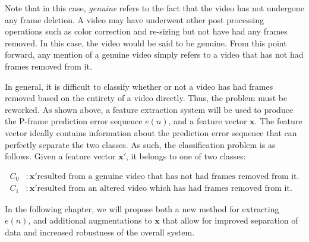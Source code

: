 Note that in this case, \emph{genuine} refers to the fact that the video has not undergone any frame deletion. A video may have underwent other post processing operations such as color correction and re-sizing but not have had any frames removed. In this case, the video would be said to be genuine. From this point forward, any mention of a genuine video simply refers to a video that has not had frames removed from it.

In general, it is difficult to classify whether or not a video has had frames removed based on the entirety of a video directly. Thus, the problem must be reworked. As shown above, a feature extraction system will be used to produce the P-frame prediction error sequence $e(n)$, and a feature vector $\bm{x}$. The feature vector ideally contains information about the prediction error sequence that can perfectly separate the two classes. As such, the classification problem is as follows. Given a feature vector $\bm{x}'$, it belongs to one of two classes:

\begin{equation}
\begin{aligned}
  C_{0} &: \bm{x}' \text{resulted from a genuine video that has not had frames removed from it.} \\
  C_{1} &: \bm{x}' \text{resulted from an altered video which has had frames removed from it.}
\end{aligned}
\end{equation}

In the following chapter, we will propose both a new method for extracting $e(n)$, and additional augmentations to $\bm{x}$ that allow for improved separation of data and increased robustness of the overall system.
